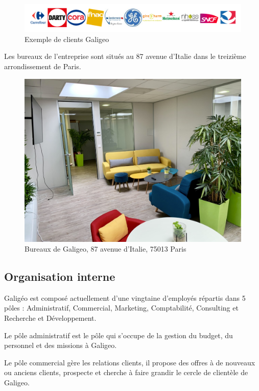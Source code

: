 \begin{figure}[H]
    \centering
    \includegraphics[width=\linewidth]{images/logos/client.png}
    \caption{Exemple de clients Galigeo}
    \label{fig:clients}
\end{figure}

Les bureaux de l'entreprise sont situés au 87 avenue d'Italie dans le treizième arrondissement de Paris.

\begin{figure}[H]
    \centering
    \includegraphics[width=12cm]{images/photos/bureaux_galigeo.png}
    \caption{Bureaux de Galigeo, 87 avenue d'Italie, 75013 Paris}
    \label{fig:offices}
\end{figure}


\subsection{Organisation interne}

Galigéo est composé actuellement d’une vingtaine d’employés répartis dans 5 pôles : Administratif, Commercial, Marketing, Comptabilité, Consulting et Recherche et Développement.

Le pôle administratif est le pôle qui s’occupe de la gestion du budget, du personnel et des missions à Galigeo.

Le pôle commercial gère les relations clients, il propose des offres à de nouveaux ou anciens clients, prospecte et cherche à faire grandir le cercle de clientèle de Galigeo.

